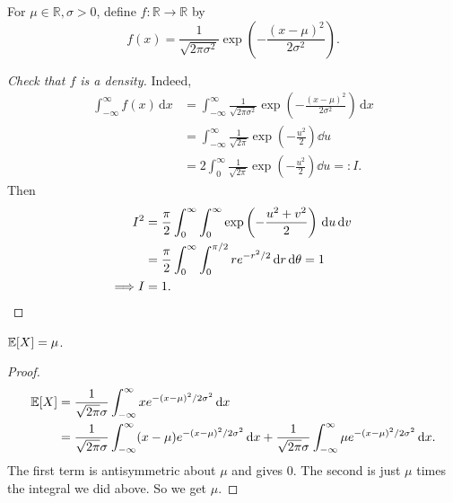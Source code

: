 \begin{example}
    For $\mu\in\mathbb R,\sigma>0$, define $ f: \mathbb{R}\to \mathbb{R} $ by
    \[
        f(x) = \frac{1}{\sqrt{2\pi\sigma^2}}\exp\left(-\frac{(x - \mu)^2}{2\sigma^2}\right).
    \]
    \begin{center}
    \end{center}
    \begin{proof}[Check that $f$ is a density]
        Indeed, 
        \begin{align*}
            \int_{-\infty}^{\infty} f(x) \,\mathrm{d}x &= \int_{-\infty}^{\infty} \frac{1}{\sqrt{2\pi\sigma^2}}\exp\left(-\frac{(x - \mu)^2}{2\sigma^2}\right) \,\mathrm{d}x\\ 
            &= \int_{-\infty}^{\infty} \frac{1}{\sqrt{2\pi}}\exp \left( -\frac{u^2}{2} \right)\dd u\\ 
            &= 2 \int_{0}^{\infty} \frac{1}{\sqrt{2\pi}} \exp \left( -\frac{u^2}{2} \right)\dd u=:I.
        \end{align*}
        Then
        \begin{align*}
          I^2 &= \frac{\pi}{2} \int_{0}^{\infty} \int_{0}^{\infty} \exp \left( -\frac{u^2+v^2}{2} \right) \,\mathrm{d}u\,\mathrm{d}v\\ 
          &= \frac{\pi}{2}\int_0^\infty \int_0^{\pi/2}re^{-r^2/2}\,\mathrm{d} r\,\mathrm{d} \theta=1\\ 
          \Longrightarrow I&=1.\qedhere
        \end{align*}
    \end{proof}
    \begin{proposition}
        ${\mathbb{E}}[X] = \mu$.
    \end{proposition}
    \begin{proof}
    \begin{align*}
    {\mathbb{E}}[X] &= \frac{1}{\sqrt{2\pi}\sigma} \int_{-\infty}^\infty x e^{-(x - \mu)^2/2\sigma^2}\,\mathrm{d} x\\
    &= \frac{1}{\sqrt{2\pi} \sigma}\int_{-\infty}^\infty (x - \mu)e^{-(x - \mu)^2/2\sigma^2}\,\mathrm{d} x + \frac{1}{\sqrt{2\pi}\sigma}\int_{-\infty}^\infty \mu e^{-(x - \mu)^2/2\sigma^2}\,\mathrm{d} x.
    \end{align*}
    The first term is antisymmetric about $\mu$ and gives $0$. The second is just $\mu$ times the integral we did above. So we get $\mu$.

\end{proof}
\end{example}
